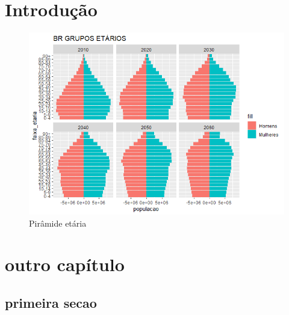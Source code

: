 \documentclass[12pt,openright,twoside,a4paper,brazil]{abntex2}
\begin{document}
\imprimirfolhaderosto

\tableofcontents

\textual

\chapter{Introdução}
\lipsum[1-4]

\begin{figure}
  \caption{Pirâmide etária}
  \includegraphics{plot-1.png}
\end{figure}



\chapter{outro capítulo}
\lipsum[5-6]

\section{primeira secao}
\lipsum[7-17]
\end{document}
